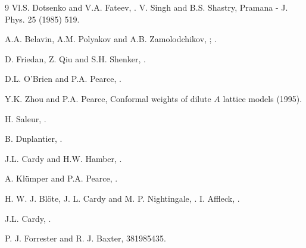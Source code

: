 \begin{thebibliography}{9}
 Vl.S. Dotsenko and V.A. Fateev, .
 V. Singh and B.S. Shastry, Pramana - J. Phys. 25 (1985) 519. 

 A.A. Belavin, A.M. Polyakov and A.B. Zamolodchikov, 
; .

 D. Friedan, Z. Qiu and S.H. Shenker, .

 D.L. O'Brien and P.A. Pearce, .

 Y.K. Zhou and P.A. Pearce, Conformal weights of dilute
$A$ lattice models (1995).

 H. Saleur, .

 B. Duplantier, .

 J.L. Cardy and H.W. Hamber, .

 A. Kl\"umper and P.A. Pearce, .

H. W. J. Bl{\"{o}}te, J. L. Cardy and 
  M. P. Nightingale, .
I. Affleck, .

 J.L. Cardy, .

P. J. Forrester and R. J. Baxter, \JSP
        {38}{1985}{435}.




\end{thebibliography}




